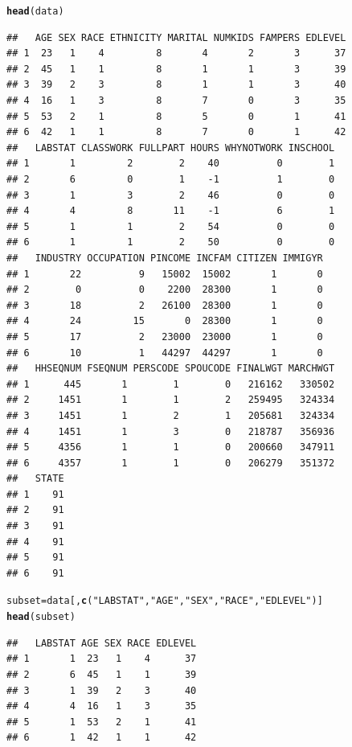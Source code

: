 \documentclass[11pt]{article}\usepackage[]{graphicx}\usepackage[]{color}
\makeatletter
\newcommand{\hlstr}[1]{\textcolor[rgb]{0.192,0.494,0.8}{#1}}%
\newcommand{\hlstd}[1]{\textcolor[rgb]{0.345,0.345,0.345}{#1}}%
\newcommand{\hlkwb}[1]{\textcolor[rgb]{0.69,0.353,0.396}{#1}}%
\newcommand{\hlkwd}[1]{\textcolor[rgb]{0.737,0.353,0.396}{\textbf{#1}}}%
\newenvironment{kframe}{%
 \def\at@end@of@kframe{}%
 \ifinner\ifhmode%
  \def\at@end@of@kframe{\end{minipage}}%
  \begin{minipage}{\columnwidth}%
 \fi\fi%
 \def\FrameCommand##1{\hskip\@totalleftmargin \hskip-\fboxsep
 \colorbox{shadecolor}{##1}\hskip-\fboxsep
     \hskip-\linewidth \hskip-\@totalleftmargin \hskip\columnwidth}%
 \MakeFramed {\advance\hsize-\width
   \@totalleftmargin\z@ \linewidth\hsize
   \@setminipage}}%
 {\par\unskip\endMakeFramed%
 \at@end@of@kframe}
\newenvironment{knitrout}{}{} %
\makeatother
\begin{document}
\begin{knitrout}
\begin{kframe}
\begin{alltt}
\hlkwd{head}\hlstd{(data)}
\end{alltt}
\begin{lstlisting}[basicstyle=\ttfamily,breaklines=true]
##   AGE SEX RACE ETHNICITY MARITAL NUMKIDS FAMPERS EDLEVEL
## 1  23   1    4         8       4       2       3      37
## 2  45   1    1         8       1       1       3      39
## 3  39   2    3         8       1       1       3      40
## 4  16   1    3         8       7       0       3      35
## 5  53   2    1         8       5       0       1      41
## 6  42   1    1         8       7       0       1      42
##   LABSTAT CLASSWORK FULLPART HOURS WHYNOTWORK INSCHOOL
## 1       1         2        2    40          0        1
## 2       6         0        1    -1          1        0
## 3       1         3        2    46          0        0
## 4       4         8       11    -1          6        1
## 5       1         1        2    54          0        0
## 6       1         1        2    50          0        0
##   INDUSTRY OCCUPATION PINCOME INCFAM CITIZEN IMMIGYR
## 1       22          9   15002  15002       1       0
## 2        0          0    2200  28300       1       0
## 3       18          2   26100  28300       1       0
## 4       24         15       0  28300       1       0
## 5       17          2   23000  23000       1       0
## 6       10          1   44297  44297       1       0
##   HHSEQNUM FSEQNUM PERSCODE SPOUCODE FINALWGT MARCHWGT
## 1      445       1        1        0   216162   330502
## 2     1451       1        1        2   259495   324334
## 3     1451       1        2        1   205681   324334
## 4     1451       1        3        0   218787   356936
## 5     4356       1        1        0   200660   347911
## 6     4357       1        1        0   206279   351372
##   STATE
## 1    91
## 2    91
## 3    91
## 4    91
## 5    91
## 6    91
\end{lstlisting}
\begin{alltt}
\hlstd{subset} \hlkwb{=} \hlstd{data[,}\hlkwd{c}\hlstd{(}\hlstr{"LABSTAT"}\hlstd{,}\hlstr{"AGE"}\hlstd{,}\hlstr{"SEX"}\hlstd{,}\hlstr{"RACE"}\hlstd{,}\hlstr{"EDLEVEL"}\hlstd{)]}
\hlkwd{head}\hlstd{(subset)}
\end{alltt}
\begin{lstlisting}[basicstyle=\ttfamily,breaklines=true]
##   LABSTAT AGE SEX RACE EDLEVEL
## 1       1  23   1    4      37
## 2       6  45   1    1      39
## 3       1  39   2    3      40
## 4       4  16   1    3      35
## 5       1  53   2    1      41
## 6       1  42   1    1      42
\end{lstlisting}
\end{kframe}
\end{knitrout}
\end{document}
